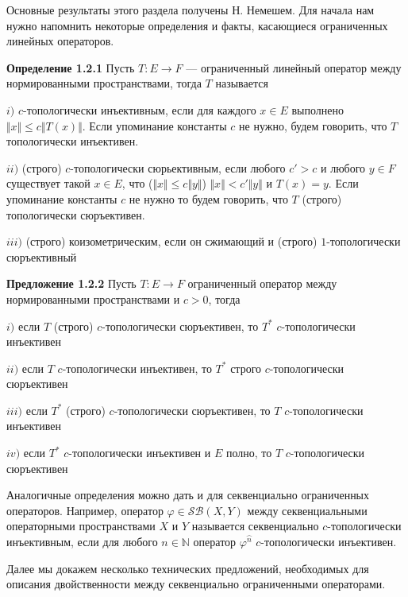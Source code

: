 \documentclass[12pt]{article}
\begin{document}
Основные результаты этого раздела получены Н. Немешем. Для начала нам нужно напомнить некоторые определения и факты, касающиеся ограниченных линейных операторов.

{\bf Определение 1.2.1}\label{DefNorOpType} Пусть $ T:E\to F$ --- ограниченный линейный оператор между нормированными пространствами, тогда $ T$ называется

$i)$ $c$-топологически инъективным, если для каждого $x \in E$ выполнено $\Vert x\Vert\leq c\Vert  T(x)\Vert$. Если упоминание константы $c$ не нужно, будем говорить, что $ T$ топологически инъективен.

$ii)$ (строго) $c$-топологически сюрьективным, если любого $c'>c$ и любого $y\in F$ существует такой $x \in E$, что ($\Vert x \Vert \leq c \Vert y \Vert$) $\Vert x \Vert < c' \Vert y \Vert$ и $ T(x) = y$. 
Если упоминание константы $c$ не нужно то будем говорить, что $ T$ (строго) топологически сюръективен.

$iii)$ (строго) коизометрическим, если он сжимающий и (строго) $1$-топологически сюръективный

\medskip

{\bf Предложение 1.2.2}\label{PrDualOps} Пусть $ T:E\to F$ ограниченный оператор между нормированными пространствами и $c>0$, тогда

$i)$ если $ T$ (строго) $c$-топологически сюръективен, то $ T^*$ $c$-топологически инъективен

$ii)$ если $ T$ $c$-топологически инъективен, то $ T^*$ строго $c$-топологически сюръективен

$iii)$ если $ T^*$ (строго) $c$-топологически сюръективен, то $ T$ $c$-топологически инъективен

$iv)$ если $ T^*$ $c$-топологически инъективен и $E$ полно, то $ T$ $c$-топологически сюръективен

\medskip

Аналогичные определения можно дать и для секвенциально ограниченных операторов. Например, оператор $\varphi\in\mathcal{SB}(X,Y)$ между секвенциальными операторными пространствами $X$ и $Y$ называется секвенциально $c$-топологически инъективным, если для любого $n\in\mathbb{N}$ оператор $\varphi^{\wideparen{n}}$ $c$-топологически инъективен.

\medskip

Далее мы докажем несколько технических предложений, необходимых для описания двойственности между секвенциально ограниченными операторами.

\medskip
\end{document}
